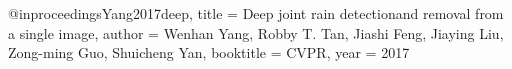 @inproceedings{Yang2017deep,
title = {Deep joint rain detectionand removal from a single image},
author = {Wenhan Yang, Robby T. Tan, Jiashi Feng, Jiaying Liu, Zong-ming Guo, Shuicheng Yan},
booktitle = {CVPR},
year = {2017}
}
